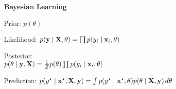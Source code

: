 \textbf{Bayesian Learning}
\begin{itemize*}
    \item Prior: \(p(\theta)\)
    \item Likelihood: \(p(\vb{y} \mid \vb{X}, \theta) = \prod p(y_i \mid \vb{x}_i, \theta)\) 
    \item Posterior: \\ \(p(\theta \mid \vb{y}, \vb{X}) = \frac{1}{Z}p(\theta)\prod p(y_i \mid \vb{x}_i, \theta)\)
    \item Prediction: \(p(y^\star \mid \vb{x}^\star, \vb{X}, \vb{y}) = \int p(y^\star \mid \vb{x}^\star, \theta) p(\theta \mid \vb{X}, \vb{y}) \, d\theta\)
\end{itemize*}
